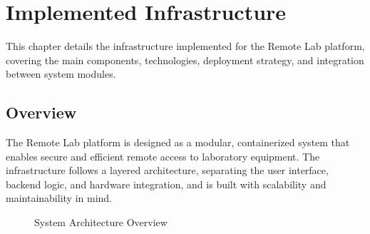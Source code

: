 %
%
\chapter{Implemented Infrastructure} \label{cap:implemented-infrastructure}

This chapter details the infrastructure implemented for the Remote Lab platform, covering the main components, technologies, deployment strategy, and integration between system modules.

\section{Overview}

The Remote Lab platform is designed as a modular, containerized system that enables secure and efficient remote access to laboratory equipment. The infrastructure follows a layered architecture, separating the user interface, backend logic, and hardware integration, and is built with scalability and maintainability in mind.

\begin{figure}[h]
    \begin{center}
    \end{center}
    \caption{System Architecture Overview}
    \label{fig:system-architecture}
\end{figure}





